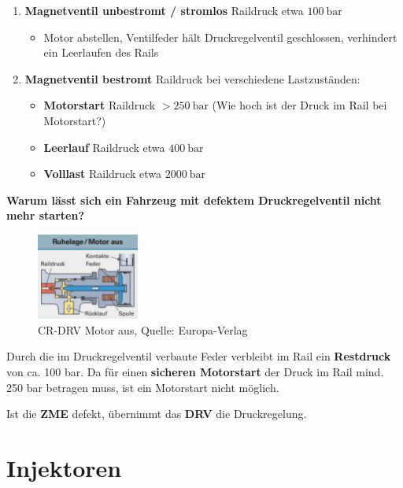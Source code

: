 \begin{enumerate}
\item
  \textbf{Magnetventil unbestromt / stromlos} Raildruck etwa
  $100~\text{bar}$

  \begin{itemize}
  \item
    Motor abstellen, Ventilfeder hält Druckregelventil geschlossen,
    verhindert ein Leerlaufen des Rails
  \end{itemize}
\item
  \textbf{Magnetventil bestromt} Raildruck bei verschiedene
  Lastzuständen:

  \begin{itemize}
  \item
    \textbf{Motorstart} Raildruck $> 250~\text{bar}$ (Wie hoch ist der
    Druck im Rail bei Motorstart?)
  \item
    \textbf{Leerlauf} Raildruck etwa $400~\text{bar}$
  \item
    \textbf{Volllast} Raildruck etwa $2000~\text{bar}$
  \end{itemize}
\end{enumerate}

\newpage

\textbf{Warum lässt sich ein Fahrzeug mit defektem Druckregelventil
nicht mehr starten?}

\begin{figure}[!ht]%
\centering
\includegraphics[width=0.3\textwidth]{images/Diesel/Diesel-4.pdf}
\caption{CR-DRV Motor aus, Quelle: Europa-Verlag}
\end{figure}

Durch die im Druckregelventil verbaute Feder verbleibt im Rail ein
\textbf{Restdruck} von ca. 100 bar. Da für einen \textbf{sicheren
Motorstart} der Druck im Rail mind. 250 bar betragen muss, ist ein
Motorstart nicht möglich.

Ist die \textbf{ZME} defekt, übernimmt das \textbf{DRV} die
Druckregelung.

\newpage

\section{Injektoren}\label{injektoren}

